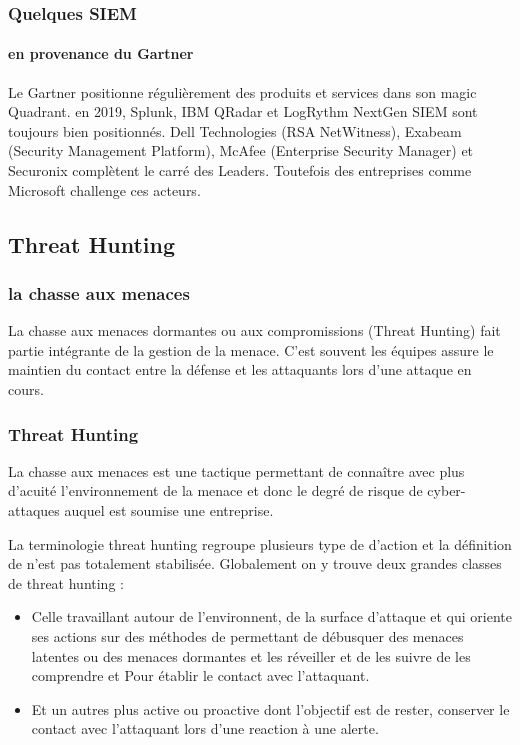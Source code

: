 \begin{frame}
\frametitle<presentation>{Quelques SIEM}
\framesubtitle<presentation>{en provenance du Gartner}
Le Gartner positionne régulièrement des produits et services dans son magic Quadrant. en 2019, Splunk, IBM QRadar et LogRythm NextGen SIEM sont toujours bien positionnés.
Dell Technologies (RSA NetWitness), Exabeam (Security Management Platform), McAfee (Enterprise Security Manager) et Securonix complètent le carré des Leaders.
Toutefois des entreprises comme Microsoft challenge ces acteurs.
\end{frame}

\subsection{Threat Hunting}

\subsubsection{la chasse aux menaces}

La chasse aux menaces dormantes ou aux compromissions (Threat Hunting) fait partie intégrante de la gestion de la menace. 
C'est souvent les équipes  assure le maintien du contact entre la défense et les attaquants lors d'une attaque en cours.


\begin{frame}
\frametitle<presentation>{Threat Hunting}
La chasse aux menaces est une tactique permettant de connaître avec plus d'acuité l'environnement de la menace et donc  le degré de risque de cyber-attaques auquel est soumise une entreprise. 

La terminologie threat hunting regroupe plusieurs type de d'action et la définition de n'est pas totalement stabilisée. Globalement on y trouve deux grandes classes de threat hunting :

\begin{itemize}
  \item Celle travaillant autour de l'environnent, de la surface d'attaque et qui oriente ses actions sur des méthodes de  permettant de débusquer des menaces latentes ou des menaces dormantes et les réveiller et de les suivre de les comprendre et Pour établir le contact avec l'attaquant.

  \item Et un autres plus active ou proactive dont l'objectif est de rester, conserver le contact avec l'attaquant lors d'une reaction à une alerte.
\end{itemize}


\end{frame}


